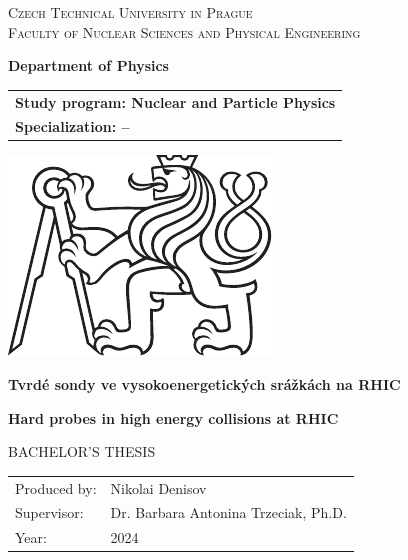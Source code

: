 \documentclass[a4paper,oneside,12pt]{book}
\newcommand{\tb}{\textbf} %
\newcommand{\cvut}{Czech Technical University in Prague}
\newcommand{\fjfi}{Faculty of Nuclear Sciences and Physical Engineering}
\newcommand{\katedra}{ Department of Physics}
\newcommand{\program}{Nuclear and Particle Physics} %
\newcommand{\spec}{--} %
\newcommand{\druh}{Bachelor's thesis}
\newcommand{\logoCVUT}{\includegraphics{symbol_cvut_konturova_verze_cb.pdf}} %
\newcommand{\nazevcz}{Tvrdé sondy ve vysokoenergetických srážkách na RHIC}    %
\newcommand{\nazeven}{Hard probes in high energy collisions at RHIC}          %
\newcommand{\autor}{Nikolai Denisov}
\newcommand{\vedouci}{Dr. Barbara Antonina Trzeciak, Ph.D.} %
\newcommand{\rok}{2024}  %
\newcommand{\kde}{Prague}
\newcommand{\prohlaseni}{I declare that I have prepared my thesis on my own and have used only the materials (literature, projects, etc.) listed in the attached list.}
\begin{document}
    \thispagestyle{empty}

    \begin{center}
    {\Large \textsc{\cvut}\\[4mm] \textsc{\fjfi}}\par
    \vspace{4mm}
    \tb{\katedra} \par\vspace{3mm}

    \begin{tabular}{l}
        \tb{Study program: \program}\\
        \tb{Specialization: \spec}\\
    \end{tabular}

    \vspace{10mm} \logoCVUT \vspace{15mm}

    {\huge \tb{\nazevcz}\par}
    \vspace{5mm}
    {\huge \tb{\nazeven}\par}

    \vspace{15mm}
    {\Large \MakeUppercase{\druh}}

    \vfill
    {\large
        \begin{tabular}{ll}
            Produced by: & \autor\\
            Supervisor: & \vedouci\\
            Year: & \rok
        \end{tabular}
    }
    \end{center}

    \newpage  %
    \thispagestyle{empty} %




    \newpage %
    \thispagestyle{empty}  %

    ~ %
    \vfill %
\end{document}
